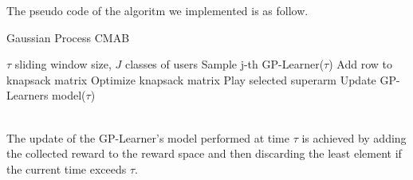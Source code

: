 The pseudo code of the algoritm we implemented is as follow.
\begin{algorithm}
	\caption{Gaussian Process CMAB}
	\begin{algorithmic}[1]
		\renewcommand{\algorithmicrequire}{\textbf{Input:}}
		\REQUIRE $\tau$ sliding window size, $J$ classes of users
			\STATE Sample j-th GP-Learner($\tau$)
			\STATE Add row to knapsack matrix
			\ENDFOR
			\STATE Optimize knapsack matrix
			\STATE Play selected superarm
			\STATE Update GP-Learners model($\tau$)
		\ENDFOR
	\end{algorithmic}
\end{algorithm}
\\The update of the GP-Learner's model performed at time $\tau$ is achieved by adding the collected reward to the reward space and then discarding the least element if the current time exceeds $\tau$.